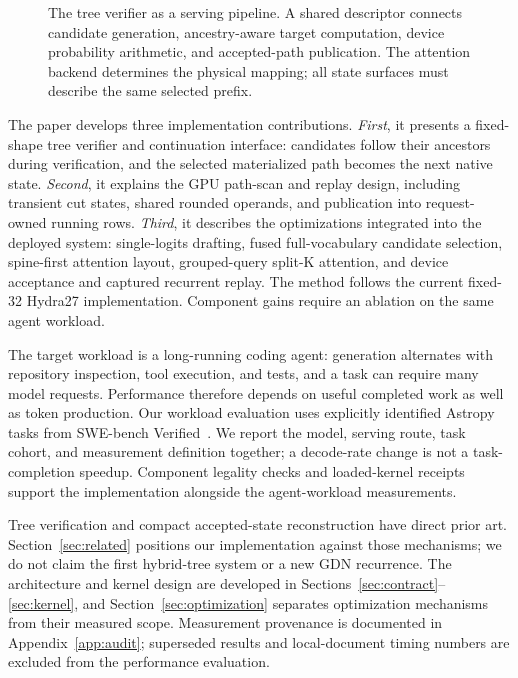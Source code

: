 \documentclass[conference]{IEEEtran}
\begin{document}
\begin{figure}[t]
\centering

\caption{The tree verifier as a serving pipeline. A shared descriptor connects candidate generation, ancestry-aware target computation, device probability arithmetic, and accepted-path publication. The attention backend determines the physical mapping; all state surfaces must describe the same selected prefix.}
\label{fig:pipeline}
\end{figure}

The paper develops three implementation contributions. \textit{First}, it presents a fixed-shape tree verifier and continuation interface: candidates follow their ancestors during verification, and the selected materialized path becomes the next native state. \textit{Second}, it explains the GPU path-scan and replay design, including transient cut states, shared rounded operands, and publication into request-owned running rows. \textit{Third}, it describes the optimizations integrated into the deployed system: single-logits drafting, fused full-vocabulary candidate selection, spine-first attention layout, grouped-query split-K attention, and device acceptance and captured recurrent replay. The method follows the current fixed-32 Hydra27 implementation. Component gains require an ablation on the same agent workload.

The target workload is a long-running coding agent: generation alternates with repository inspection, tool execution, and tests, and a task can require many model requests. Performance therefore depends on useful completed work as well as token production. Our workload evaluation uses explicitly identified Astropy tasks from SWE-bench Verified~\cite{jimenez2024swe}. We report the model, serving route, task cohort, and measurement definition together; a decode-rate change is not a task-completion speedup. Component legality checks and loaded-kernel receipts support the implementation alongside the agent-workload measurements.

Tree verification and compact accepted-state reconstruction have direct prior art. Section~\ref{sec:related} positions our implementation against those mechanisms; we do not claim the first hybrid-tree system or a new GDN recurrence. The architecture and kernel design are developed in Sections~\ref{sec:contract}--\ref{sec:kernel}, and Section~\ref{sec:optimization} separates optimization mechanisms from their measured scope. Measurement provenance is documented in Appendix~\ref{app:audit}; superseded results and local-document timing numbers are excluded from the performance evaluation.
\end{document}
